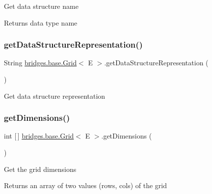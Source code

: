 Get data structure name \begin{DoxyReturn}{Returns}
data type name 
\end{DoxyReturn}
\mbox{\label{classbridges_1_1base_1_1_grid_a9a7faf2bbabae8d2f2babe9e29deb2c8}} 
\subsubsection{\texorpdfstring{get\+Data\+Structure\+Representation()}{getDataStructureRepresentation()}}
{\footnotesize\ttfamily String \hyperlink{classbridges_1_1base_1_1_grid}{bridges.\+base.\+Grid}$<$ E $>$.get\+Data\+Structure\+Representation (\begin{DoxyParamCaption}{ }\end{DoxyParamCaption})}

Get data structure representation \mbox{\label{classbridges_1_1base_1_1_grid_aee8a5b66095d65ff067a4e76f2611b0e}} 
\subsubsection{\texorpdfstring{get\+Dimensions()}{getDimensions()}}
{\footnotesize\ttfamily int \mbox{[}$\,$\mbox{]} \hyperlink{classbridges_1_1base_1_1_grid}{bridges.\+base.\+Grid}$<$ E $>$.get\+Dimensions (\begin{DoxyParamCaption}{ }\end{DoxyParamCaption})}

Get the grid dimensions

\begin{DoxyReturn}{Returns}
an array of two values (rows, cols) of the grid 
\end{DoxyReturn}
\mbox{\label{classbridges_1_1base_1_1_grid_ab79ceb737423bb28ea2348e61a625a17}} 
